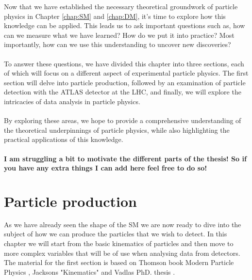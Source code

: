 \documentclass[14pt, a4paper]{book}
\begin{document}
\graphicspath{{../../figures/}}

Now that we have established the necessary theoretical groundwork of particle physics in Chapter \ref{chap:SM} and \ref{chap:DM}, it's time to explore how this knowledge can be applied. This leads us to ask important questions such as, 
how can we measure what we have learned? How do we put it into practice? Most importantly, how can we use this understanding to uncover new discoveries?\\
\\To answer these questions, we have divided this chapter into three sections, each of which will focus on a different aspect of experimental particle physics. The first section will delve into particle production, 
followed by an examination of particle detection with the ATLAS detector at the LHC, and finally, we will explore the intricacies of data analysis in particle physics.\\
\\By exploring these areas, we hope to provide a comprehensive understanding of the theoretical underpinnings of particle physics, while also highlighting the practical applications of this knowledge. \\
\\\textbf{I am struggling a bit to motivate the different parts of the thesis! So if you have any extra things I can add here feel free to do so!}

\clearpage
\section{Particle production}
As we have already seen the shape of the SM we are now ready to dive into the subject of how we can produce the particles that we wish to detect. In this chapter we will start from the basic kinematics of particles 
and then move to more complex variables that will be of use when analysing data from detectors. The material for the first section is based on Thomson book Modern Particle Physics \cite{THOMSON}, Jacksons "Kinematics" \cite{Jackson_kin}
and Vadlas PhD. thesis \cite{KNUT_VADLA}.
\end{document}
